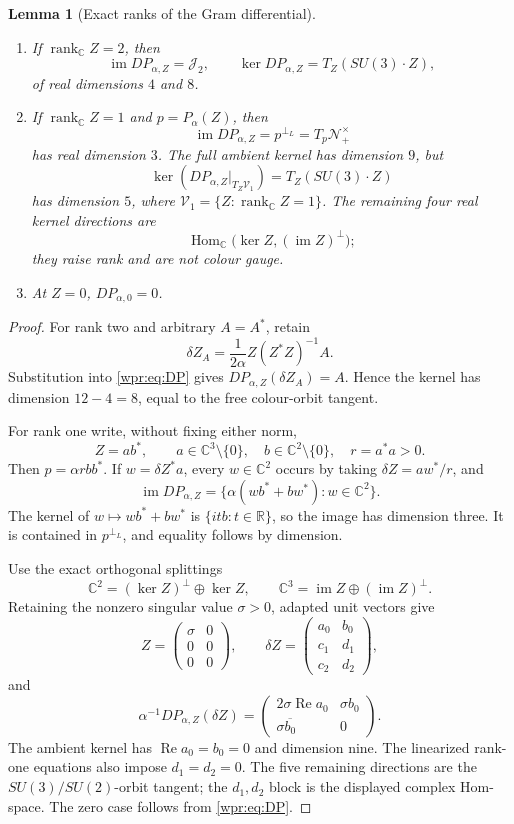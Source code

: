 \documentclass[11pt]{article}
\newtheorem{lemma}[theorem]{Lemma}
\newcommand{\J}{\mathcal J_2}
\newcommand{\V}{\mathscr V}
\newcommand{\Nfuture}{\mathcal N_+^\times}
\newcommand{\rankC}{\operatorname{rank}_{\mathbb C}}
\begin{document}
\begin{lemma}[Exact ranks of the Gram differential]
\label{wpr:lem:ranks}
\begin{enumerate}[label=\textup{(\roman*)}]
\item If \(\rankC Z=2\), then
\[
 \operatorname{im}D P_{\alpha,Z}=\J,\qquad
 \ker D P_{\alpha,Z}=T_Z(SU(3)\cdot Z),
\]
of real dimensions \(4\) and \(8\).
\item If \(\rankC Z=1\) and \(p=P_\alpha(Z)\), then
\[
 \operatorname{im}D P_{\alpha,Z}=p^{\perp_L}=T_p\Nfuture
\]
has real dimension \(3\).  The full ambient kernel has dimension \(9\),
but
\[
 \ker(D P_{\alpha,Z}|_{T_Z{\V}_1})=T_Z(SU(3)\cdot Z)
\]
has dimension \(5\), where \({\V}_1=\{Z:\rankC Z=1\}\).  The remaining
four real kernel directions are
\[
 \operatorname{Hom}_{\mathbb C}
 \bigl(\ker Z,(\operatorname{im}Z)^\perp\bigr);
\]
they raise rank and are not colour gauge.
\item At \(Z=0\), \(D P_{\alpha,0}=0\).
\end{enumerate}
\end{lemma}
\begin{proof}
For rank two and arbitrary \(A=A^*\), retain
\[
 \delta Z_A=\frac1{2\alpha}Z(Z^*Z)^{-1}A.
\]
Substitution into \eqref{wpr:eq:DP} gives
\(D P_{\alpha,Z}(\delta Z_A)=A\).  Hence the kernel has dimension
\(12-4=8\), equal to the free colour-orbit tangent.

For rank one write, without fixing either norm,
\[
 Z=ab^*,\qquad a\in\mathbb C^3\setminus\{0\},\quad
 b\in\mathbb C^2\setminus\{0\},\quad r=a^*a>0.
\]
Then \(p=\alpha rbb^*\).  If \(w=\delta Z^*a\), every
\(w\in\mathbb C^2\) occurs by taking \(\delta Z=aw^*/r\), and
\[
 \operatorname{im}D P_{\alpha,Z}
 =\{\alpha(wb^*+bw^*):w\in\mathbb C^2\}.
\]
The kernel of \(w\mapsto wb^*+bw^*\) is
\(\{itb:t\in\mathbb R\}\), so the image has dimension three.  It is
contained in \(p^{\perp_L}\), and equality follows by dimension.

Use the exact orthogonal splittings
\[
 \mathbb C^2=(\ker Z)^\perp\oplus\ker Z,\qquad
 \mathbb C^3=\operatorname{im}Z\oplus(\operatorname{im}Z)^\perp.
\]
Retaining the nonzero singular value \(\sigma>0\), adapted unit vectors
give
\[
 Z=\begin{pmatrix}\sigma&0\\0&0\\0&0\end{pmatrix},\qquad
 \delta Z=\begin{pmatrix}a_0&b_0\\c_1&d_1\\c_2&d_2\end{pmatrix},
\]
and
\[
 \alpha^{-1}D P_{\alpha,Z}(\delta Z)=
 \begin{pmatrix}
 2\sigma\operatorname{Re}a_0&\sigma b_0\\
 \sigma\overline{b_0}&0
 \end{pmatrix}.
\]
The ambient kernel has \(\operatorname{Re}a_0=b_0=0\) and dimension
nine.  The linearized rank-one equations also impose \(d_1=d_2=0\).
The five remaining directions are the \(SU(3)/SU(2)\)-orbit tangent;
the \(d_1,d_2\) block is the displayed complex Hom-space.  The zero
case follows from \eqref{wpr:eq:DP}.
\end{proof}
\end{document}
